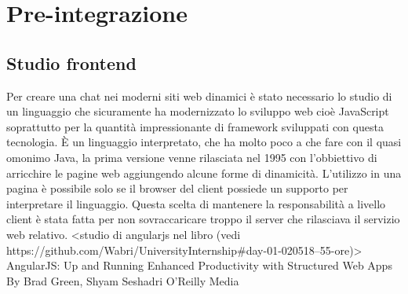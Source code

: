
\chapter{Pre-integrazione}

\section{Studio frontend}
Per creare una chat nei moderni siti web dinamici è stato necessario lo studio di un linguaggio che sicuramente ha modernizzato lo sviluppo web cioè JavaScript soprattutto per la quantità impressionante di framework sviluppati con questa tecnologia.
È un linguaggio interpretato, che ha molto poco a che fare con il quasi omonimo Java, la prima versione venne rilasciata nel 1995 con l'obbiettivo di arricchire le pagine web aggiungendo alcune forme di dinamicità. L'utilizzo in una pagina è possibile solo se il browser del client possiede un supporto per interpretare il linguaggio. Questa scelta di mantenere la responsabilità a livello client è stata fatta per non sovraccaricare troppo il server che rilasciava il servizio web relativo.
\iffalse
<studio di angularjs nel libro (vedi https://github.com/Wabri/UniversityInternship#day-01-020518--55-ore)>
AngularJS: Up and Running
Enhanced Productivity with Structured Web Apps
By Brad Green, Shyam Seshadri
O'Reilly Media

